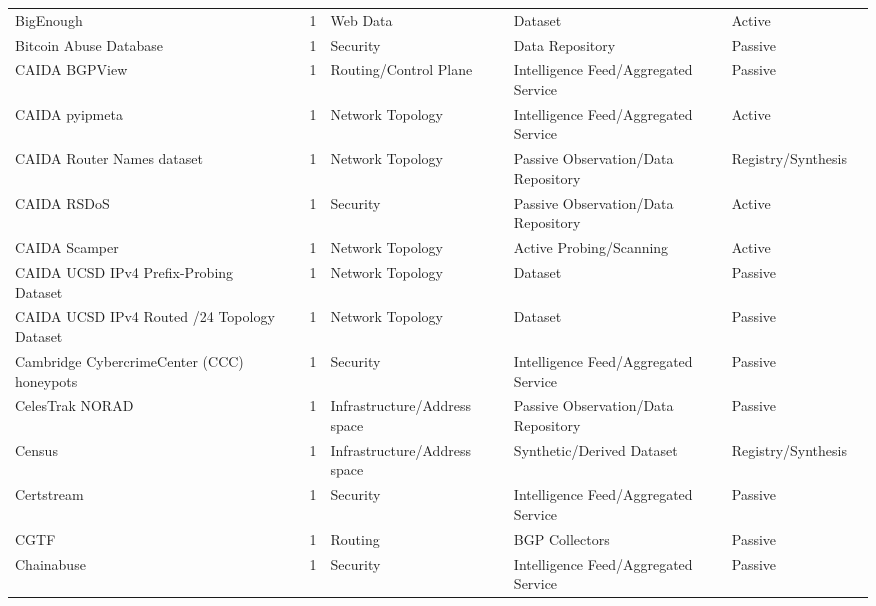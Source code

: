 \documentclass[11pt,a4paper]{article}
\begin{document}
\begin{longtable}{@{}p{}p{}p{}p{}p{}p{}p{}@{}}
BigEnough & \cite{10179289} & 1 & Web Data & Dataset & Active & \cite{10.1007/978-3-032-18268-5_13} \\
Bitcoin Abuse Database & \cite{bitcoin_abuse} & 1 & Security & Data Repository & Passive & \cite{10.1007/978-3-031-56252-5_3} \\
CAIDA BGPView & \cite{caida-bgpview} & 1 & Routing/Control Plane & Intelligence Feed/Aggregated Service & Passive & \cite{10.1145/3618257.3624819} \\
CAIDA pyipmeta & \cite{caida-pyipmeta} & 1 & Network Topology & Intelligence Feed/Aggregated Service & Active & \cite{10.1007/978-3-031-56249-5_8} \\
CAIDA Router Names dataset & \cite{caida-router-names} & 1 & Network Topology & Passive Observation/Data Repository & Registry/Synthesis & \cite{10.1145/3487552.3487848} \\
CAIDA RSDoS & \cite{caida-rsdos} & 1 & Security & Passive Observation/Data Repository & Active & \cite{10.1145/3517745.3561458} \\
CAIDA Scamper & \cite{caida-scamper} & 1 & Network Topology & Active Probing/Scanning & Active & \cite{10.1007/978-3-031-85960-1_3} \\
CAIDA UCSD IPv4 Prefix-Probing Dataset & \cite{caidaprobing} & 1 & Network Topology & Dataset & Passive & \cite{10.1145/3777912.3839834} \\
CAIDA UCSD IPv4 Routed /24 Topology Dataset & \cite{caidaipv4} & 1 & Network Topology & Dataset & Passive & \cite{10.1145/3777912.3839834} \\
Cambridge CybercrimeCenter (CCC) honeypots & \cite{ccc-honeypots} & 1 & Security & Intelligence Feed/Aggregated Service & Passive & \cite{10.1145/3487552.3487835} \\
CelesTrak NORAD & \cite{celestrak-norad} & 1 & Infrastructure/Address space & Passive Observation/Data Repository & Passive & \cite{10.1145/3646547.3689024} \\
Census & \cite{census} & 1 & Infrastructure/Address space & Synthetic/Derived Dataset & Registry/Synthesis & \cite{10.1145/3646547.3688452} \\
Certstream & \cite{certstream} & 1 & Security & Intelligence Feed/Aggregated Service & Passive & \cite{10.1145/3646547.3689021} \\
CGTF & \cite{cgtf} & 1 & Routing & BGP Collectors & Passive & \cite{10.1145/3777912.3839829} \\
Chainabuse & \cite{chainabuse} & 1 & Security & Intelligence Feed/Aggregated Service & Passive & \cite{10.1145/3730567.3764476} \\

\end{longtable}
\end{document}
